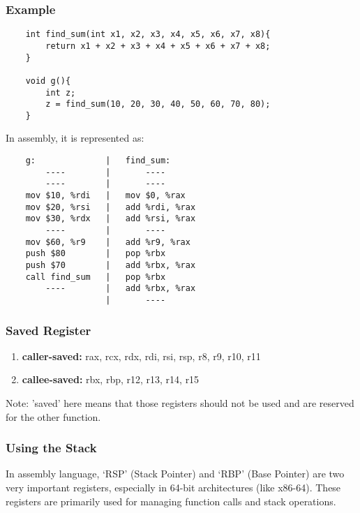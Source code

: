 \documentclass{article}
\begin{document}
\subsubsection*{Example}
\begin{verbatim}
    int find_sum(int x1, x2, x3, x4, x5, x6, x7, x8){
        return x1 + x2 + x3 + x4 + x5 + x6 + x7 + x8;
    }

    void g(){
        int z;
        z = find_sum(10, 20, 30, 40, 50, 60, 70, 80);
    }
\end{verbatim}
In assembly, it is represented as:
\begin{verbatim}
    g:              |   find_sum:
        ----        |       ----
        ----        |       ----
    mov $10, %rdi   |   mov $0, %rax
    mov $20, %rsi   |   add %rdi, %rax
    mov $30, %rdx   |   add %rsi, %rax
        ----        |       ----
    mov $60, %r9    |   add %r9, %rax
    push $80        |   pop %rbx
    push $70        |   add %rbx, %rax
    call find_sum   |   pop %rbx
        ----        |   add %rbx, %rax
                    |       ----
\end{verbatim}

\subsubsection{Saved Register}
\begin{enumerate}
    \item \textbf{caller-saved: }rax, rcx, rdx, rdi, rsi, rsp, r8, r9, r10, r11
    \item \textbf{callee-saved: }rbx, rbp, r12, r13, r14, r15
\end{enumerate}
Note: 'saved' here means that those registers should not be used and are reserved for the other function.

\subsubsection{Using the Stack}
In assembly language, ‘RSP’ (Stack Pointer) and ‘RBP’ (Base Pointer) are two very important registers, especially in 64-bit architectures (like x86-64). These registers are primarily used for managing function calls and stack operations.
\end{document}
